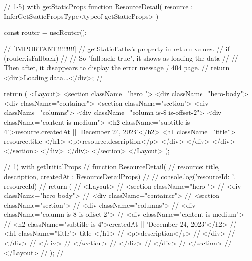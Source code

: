 // 1-5) with getStaticProps
function ResourceDetail(
  { resource }: InferGetStaticPropsType<typeof getStaticProps>
) {
  const router = useRouter();

  // [IMPORTANT!!!!!!!!!]
  // getStaticPaths's property in return values.
  // if (router.isFallback) {
  //   // So "fallback: true", it shows as loading the data
  //   // Then after, it disappears to display the error message / 404 page.
  //   return <div>Loading data...</div>;
  // }

  return (
    <Layout>
      <section className="hero ">
        <div className="hero-body">
          <div className="container">
            <section className="section">
              <div className="columns">
                <div className="column is-8 is-offset-2">
                  <div className="content is-medium">
                    <h2 className="subtitle is-4">{resource.createdAt || 'December 24, 2023'}</h2>
                    <h1 className="title">{ resource.title }</h1>
                    <p>{resource.description}</p>
                  </div>
                </div>
              </div>
            </section>
          </div>
        </div>
      </section>
    </Layout>
  );
}

// 1) with getInitialProps
// function ResourceDetail(
//   { resource: { title, description, createdAt } }: ResourceDetailProps) {
//   // console.log('resourceId: ', resourceId)
//   return (
//     <Layout>
//       <section className="hero ">
//         <div className="hero-body">
//           <div className="container">
//             <section className="section">
//               <div className="columns">
//                 <div className="column is-8 is-offset-2">
//                   <div className="content is-medium">
//                     <h2 className="subtitle is-4">{createdAt || 'December 24, 2023'}</h2>
//                     <h1 className="title">{ title }</h1>
//                     <p>{description}</p>
//                   </div>
//                 </div>
//               </div>
//             </section>
//           </div>
//         </div>
//       </section>
//     </Layout>
//   );
// }

